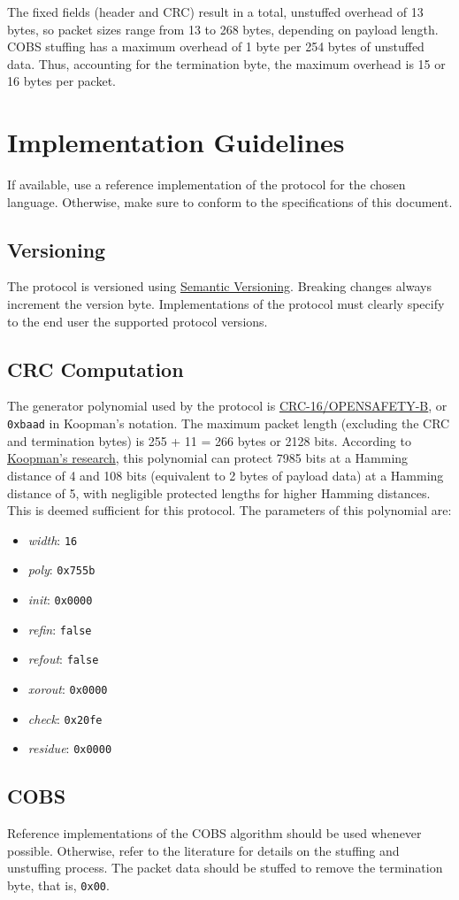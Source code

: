 \documentclass[a4paper,11pt,english]{article}
\begin{document}
The fixed fields (header and CRC) result in a total, unstuffed overhead of 13 bytes, so packet sizes range from 13 to 268 bytes, depending on payload length. COBS stuffing has a maximum overhead of 1 byte per 254 bytes of unstuffed data. Thus, accounting for the termination byte, the maximum overhead is 15 or 16 bytes per packet.

\section[impl]{Implementation Guidelines}

If available, use a reference implementation of the protocol for the chosen language. Otherwise, make sure to conform to the specifications of this document.

\subsection[i:version]{Versioning}

The protocol is versioned using \href{https://semver.org/}{Semantic Versioning}. Breaking changes always increment the version byte. Implementations of the protocol must clearly specify to the end user the supported protocol versions.

\subsection[i:crc]{CRC Computation}

The generator polynomial used by the protocol is \href{https://reveng.sourceforge.io/crc-catalogue/all.htm#crc.cat.crc-16-opensafety-b}{CRC-16/OPENSAFETY-B}, or \texttt{0xbaad} in Koopman's notation. The maximum packet length (excluding the CRC and termination bytes) is 255 + 11 = 266 bytes or 2128 bits. According to \href{https://users.ece.cmu.edu/~koopman/crc/c16/0xbaad_len.txt}{Koopman's research}, this polynomial can protect 7985 bits at a Hamming distance of 4 and 108 bits (equivalent to 2 bytes of payload data) at a Hamming distance of 5, with negligible protected lengths for higher Hamming distances. This is deemed sufficient for this protocol. The parameters of this polynomial are:

\begin{itemize}
  \item \textit{width}: \texttt{16}
  \item \textit{poly}: \texttt{0x755b}
  \item \textit{init}: \texttt{0x0000}
  \item \textit{refin}: \texttt{false}
  \item \textit{refout}: \texttt{false}
  \item \textit{xorout}: \texttt{0x0000}
  \item \textit{check}: \texttt{0x20fe}
  \item \textit{residue}: \texttt{0x0000}
\end{itemize}

\subsection[i:cobs]{COBS}
Reference implementations of the COBS algorithm should be used whenever possible. Otherwise, refer to the literature for details on the stuffing and unstuffing process. The packet data should be stuffed to remove the termination byte, that is, \texttt{0x00}.
\end{document}
